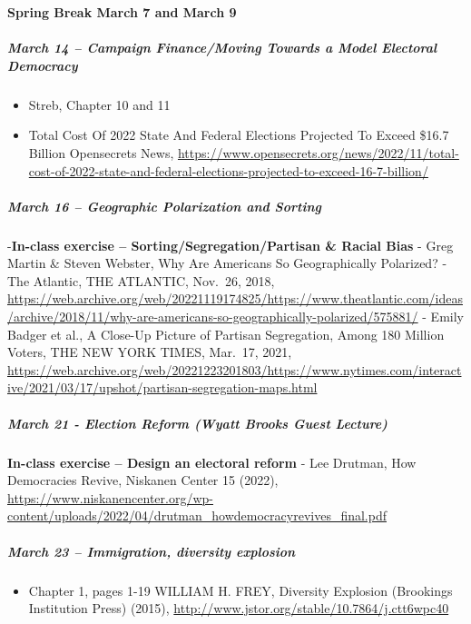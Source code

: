 \documentclass[
]{article}
\providecommand{\tightlist}{%
  \setlength{\itemsep}{0pt}\setlength{\parskip}{0pt}}
\begin{document}
\textbf{Spring Break March 7 and March 9}

\hypertarget{march-14-campaign-financemoving-towards-a-model-electoral-democracy}{%
\subparagraph{March 14 -- Campaign Finance/Moving Towards a Model
Electoral
Democracy}\label{march-14-campaign-financemoving-towards-a-model-electoral-democracy}}

\begin{itemize}
\tightlist
\item
  Streb, Chapter 10 and 11
\item
  Total Cost Of 2022 State And Federal Elections Projected To Exceed
  \$16.7 Billion Opensecrets News,
  \url{https://www.opensecrets.org/news/2022/11/total-cost-of-2022-state-and-federal-elections-projected-to-exceed-16-7-billion/}
\end{itemize}

\hypertarget{march-16-geographic-polarization-and-sorting}{%
\subparagraph{March 16 -- Geographic Polarization and
Sorting}\label{march-16-geographic-polarization-and-sorting}}

-\textbf{In-class exercise -- Sorting/Segregation/Partisan \& Racial
Bias} - Greg Martin \& Steven Webster, Why Are Americans So
Geographically Polarized? - The Atlantic, THE ATLANTIC, Nov.~26, 2018,
\url{https://web.archive.org/web/20221119174825/https://www.theatlantic.com/ideas/archive/2018/11/why-are-americans-so-geographically-polarized/575881/}
- Emily Badger et al., A Close-Up Picture of Partisan Segregation, Among
180 Million Voters, THE NEW YORK TIMES, Mar.~17, 2021,
\url{https://web.archive.org/web/20221223201803/https://www.nytimes.com/interactive/2021/03/17/upshot/partisan-segregation-maps.html}

\hypertarget{march-21---election-reform-wyatt-brooks-guest-lecture}{%
\subparagraph{March 21 - Election Reform (Wyatt Brooks Guest
Lecture)}\label{march-21---election-reform-wyatt-brooks-guest-lecture}}

\textbf{In-class exercise -- Design an electoral reform} - Lee Drutman,
How Democracies Revive, Niskanen Center 15 (2022),
\url{https://www.niskanencenter.org/wp-content/uploads/2022/04/drutman_howdemocracyrevives_final.pdf}

\hypertarget{march-23-immigration-diversity-explosion}{%
\subparagraph{March 23 -- Immigration, diversity
explosion}\label{march-23-immigration-diversity-explosion}}

\begin{itemize}
\tightlist
\item
  Chapter 1, pages 1-19 WILLIAM H. FREY, Diversity Explosion (Brookings
  Institution Press) (2015),
  \url{http://www.jstor.org/stable/10.7864/j.ctt6wpc40}
\end{itemize}
\end{document}
